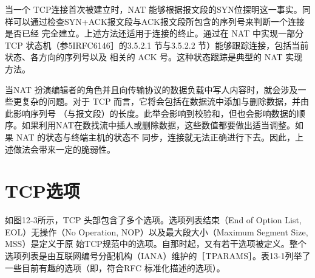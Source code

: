 当一个 TCP连接首次被建立时，NAT
能够根据报文段的SYN位探明这一事实。同样可以通过检查SYN+ACK报文段与ACK报文段所包含的序列号来判断一个连接是否已经
完全建立。上述方法还适用于连接的终止。通过在 NAT 中实现一部分TCP 状态机（参5IRFC6146］的3.5.2.1
节与3.5.2.2 节）能够跟踪连接，包括当前状态、各方向的序列号以及
相关的 ACK 号。这种状态跟踪是典型的 NAT 实现方法。

当NAT 扮演编辑者的角色并且向传输协议的数据负载中写人内容时，就会涉及一些更复杂的问题。对于 TCP
而言，它将会包括在数据流中添加与删除数据，并由此影响序列号
（与报文段）的长度。此举会影响到校验和，但也会影响数据的顺序。如果利用NAT在数找流中插人或删除数据，这些数值都要做出适当调整。如果
NAT 的状态与终端主机的状态不
同步，连接就无法正确进行下去。因此，上述做法会带来一定的脆弱性。

\section{TCP选项} \label{tcpOpt}
如图12-3所示，TCP 头部包含了多个选项。选项列表结束（End of Option List, EOL）无操作（No
Operation, NOP）以及最大段大小（Maximum Segment Size, MSS）是定义于原
始TCP规范中的选项。自那时起，又有若干选项被定义。整个选项列表是由互联网编号分配机构（IANA）维护的［TPARAMS］。表13-1列举了一些目前有趣的选项（即，符合RFC
标准化描述的选项）。

